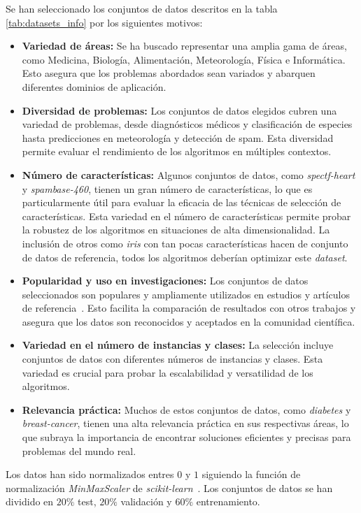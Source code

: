 Se han seleccionado los conjuntos de datos descritos en la tabla \ref{tab:datasets_info} por los siguientes motivos:
\begin{itemize}
    \item \textbf{Variedad de áreas:} Se ha buscado representar una amplia gama de áreas, como Medicina, Biología, Alimentación, Meteorología, Física e Informática. Esto asegura que los problemas abordados sean variados y abarquen diferentes dominios de aplicación.
    \item \textbf{Diversidad de problemas:} Los conjuntos de datos elegidos cubren una variedad de problemas, desde diagnósticos médicos y clasificación de especies hasta predicciones en meteorología y detección de spam. Esta diversidad permite evaluar el rendimiento de los algoritmos en múltiples contextos.
    \item \textbf{Número de características:} Algunos conjuntos de datos, como \textit{spectf-heart} y \textit{spambase-460}, tienen un gran número de características, lo que es particularmente útil para evaluar la eficacia de las técnicas de selección de características. Esta variedad en el número de características permite probar la robustez de los algoritmos en situaciones de alta dimensionalidad. La inclusión de otros como \textit{iris} con tan pocas características hacen de conjunto de datos de referencia, todos los algoritmos deberían optimizar este \textit{dataset}.
    \item \textbf{Popularidad y uso en investigaciones:} Los conjuntos de datos seleccionados son populares y ampliamente utilizados en estudios y artículos de referencia~\cite{zhang_return-cost-based_2017, mafarja_binary_2019, emary_binary_2016, mafarja_whale_2018}. Esto facilita la comparación de resultados con otros trabajos y asegura que los datos son reconocidos y aceptados en la comunidad científica.
    \item \textbf{Variedad en el número de instancias y clases:} La selección incluye conjuntos de datos con diferentes números de instancias y clases. Esta variedad es crucial para probar la escalabilidad y versatilidad de los algoritmos.
    \item \textbf{Relevancia práctica:} Muchos de estos conjuntos de datos, como \textit{diabetes} y \textit{breast-cancer}, tienen una alta relevancia práctica en sus respectivas áreas, lo que subraya la importancia de encontrar soluciones eficientes y precisas para problemas del mundo real.
\end{itemize}
Los datos han sido normalizados entres $0$ y $1$ siguiendo la función de normalización \textit{MinMaxScaler} de \textit{scikit-learn}~\cite{scikit-learn}. Los conjuntos de datos se han dividido en $20\%$ test, $20\%$ validación y $60\%$ entrenamiento.

